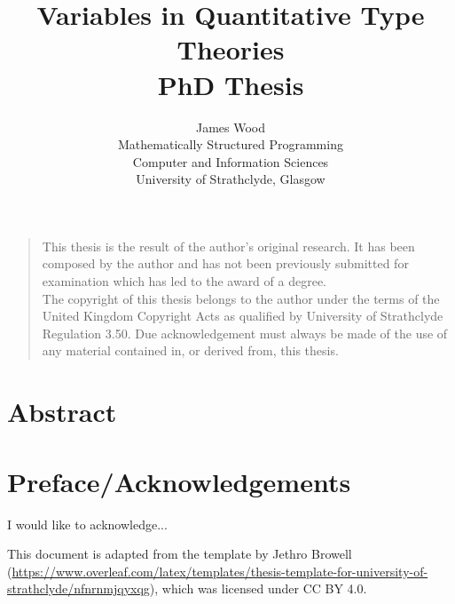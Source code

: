 \documentclass[a4paper,oneside,11pt]{book}
\title{Variables in Quantitative Type Theories \\ PhD Thesis}
\author{James Wood
\\ \small Mathematically Structured Programming\\[-0.8ex]
\small Computer and Information Sciences\\[-0.8ex]
\small University of Strathclyde, Glasgow\\
}
\theoremstyle{definition}
\begin{document}
\maketitle


\frontmatter

\vspace*{\fill}
\noindent
\begin{quote}
  \centering
  This thesis is the result of the author's original research. It has been composed by the author and has not been previously submitted for examination which has led to the award of a degree. \\[5pt]
  The copyright of this thesis belongs to the author under the terms of the United Kingdom Copyright Acts as qualified by University of Strathclyde Regulation 3.50. Due acknowledgement must always be made of the use of any material contained in, or derived from, this thesis. \\[5pt]
\end{quote}
\vspace*{\fill}



\chapter{Abstract}



\tableofcontents

\listoffigures

\listoftables



\chapter{Preface/Acknowledgements}
I would like to acknowledge...

This document is adapted from the template by Jethro Browell
(\url{https://www.overleaf.com/latex/templates/thesis-template-for-university-of-strathclyde/nfnrnmjqyxqg}),
which was licensed under CC BY 4.0.



\mainmatter
\end{document}
